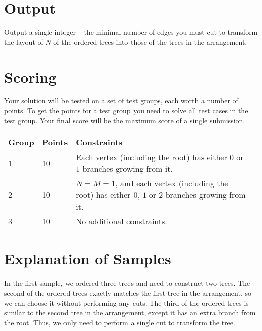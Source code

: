 \section*{Output}
Output a single integer -- the minimal number of edges you must cut to transform the layout of $N$ of the ordered trees into those of the trees in the arrangement.

\section*{Scoring}
Your solution will be tested on a set of test groups, each worth a number of points.
To get the points for a test group you need to solve all test cases in the test group.
Your final score will be the maximum score of a single submission.

\noindent
\begin{tabular}{| l | l | l | l |}
\hline
Group & Points & Constraints \\ \hline
1     & 10     & Each vertex (including the root) has either $0$ or $1$ branches growing from it.  \\ \hline
2     & 10     & $N = M = 1$, and each vertex (including the root) has either $0$, $1$ or $2$ branches growing from it.  \\ \hline
3     & 10     & No additional constraints. \\ \hline
\end{tabular}

\section*{Explanation of Samples}
In the first sample, we ordered three trees and need to construct two trees.
The second of the ordered trees exactly matches the first tree in the arrangement, so we can choose it without performing any cuts.
The third of the ordered trees is similar to the second tree in the arrangement, except it has an extra branch from the root.
Thus, we only need to perform a single cut to transform the tree.
